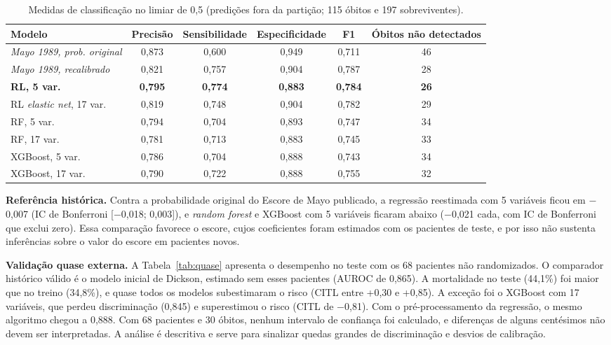 \begin{table}[htbp]
\centering
\caption{Medidas de classificação no limiar de 0,5 (predições fora da partição; 115 óbitos e 197 sobreviventes).}
\label{tab:limiar}
\small
\renewcommand{\arraystretch}{1.14}
\begin{adjustbox}{max width=\linewidth}
\begin{tabular}{@{}lccccc@{}}
\toprule
\textbf{Modelo} & \textbf{Precisão} & \textbf{Sensibilidade} & \textbf{Especificidade} & \textbf{F1} & \textbf{Óbitos não detectados} \\
\midrule
\textit{Mayo 1989, prob. original} & 0,873 & 0,600 & 0,949 & 0,711 & 46 \\
\textit{Mayo 1989, recalibrado} & 0,821 & 0,757 & 0,904 & 0,787 & 28 \\
\textbf{RL, 5 var.} & \textbf{0,795} & \textbf{0,774} & \textbf{0,883} & \textbf{0,784} & \textbf{26} \\
RL \textit{elastic net}, 17 var. & 0,819 & 0,748 & 0,904 & 0,782 & 29 \\
RF, 5 var. & 0,794 & 0,704 & 0,893 & 0,747 & 34 \\
RF, 17 var. & 0,781 & 0,713 & 0,883 & 0,745 & 33 \\
XGBoost, 5 var. & 0,786 & 0,704 & 0,888 & 0,743 & 34 \\
XGBoost, 17 var. & 0,790 & 0,722 & 0,888 & 0,755 & 32 \\
\bottomrule
\end{tabular}
\end{adjustbox}
\par{}
\end{table}

\textbf{Referência histórica.} Contra a probabilidade original do Escore de Mayo publicado, a regressão reestimada com 5 variáveis ficou em $-$0,007 (IC de Bonferroni [$-$0,018; 0,003]), e \textit{random forest} e XGBoost com 5 variáveis ficaram abaixo ($-$0,021 cada, com IC de Bonferroni que exclui zero). Essa comparação favorece o escore, cujos coeficientes foram estimados com os pacientes de teste, e por isso não sustenta inferências sobre o valor do escore em pacientes novos.

\textbf{Validação quase externa.} A Tabela~\ref{tab:quase} apresenta o desempenho no teste com os 68 pacientes não randomizados. O comparador histórico válido é o modelo inicial de Dickson, estimado sem esses pacientes (AUROC de 0,865). A mortalidade no teste (44,1\%) foi maior que no treino (34,8\%), e quase todos os modelos subestimaram o risco (CITL entre +0,30 e +0,85). A exceção foi o XGBoost com 17 variáveis, que perdeu discriminação (0,845) e superestimou o risco (CITL de $-$0,81). Com o pré-processamento da regressão, o mesmo algoritmo chegou a 0,888. Com 68 pacientes e 30 óbitos, nenhum intervalo de confiança foi calculado, e diferenças de alguns centésimos não devem ser interpretadas. A análise é descritiva e serve para sinalizar quedas grandes de discriminação e desvios de calibração.

